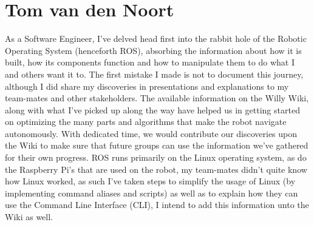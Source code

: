 \section{Tom van den Noort}

As a Software Engineer, I've delved head first into the rabbit hole of the Robotic Operating System (henceforth ROS), absorbing the information about how it is built, how its components function and how to manipulate them to do what I and others want it to. 
The first mistake I made is not to document this journey, although I did share my discoveries in presentations and explanations to my team-mates and other stakeholders. 
The available information on the Willy Wiki, along with what I've picked up along the way have helped us in getting started on optimizing the many parts and algorithms that make the robot navigate autonomously. With dedicated time, we would contribute our discoveries upon the Wiki to make sure that future groups can use the information we've gathered for their own progress. 
ROS runs primarily on the Linux operating system, as do the Raspberry Pi's that are used on the robot, my team-mates didn't quite know how Linux worked, as such I've taken steps to simplify the usage of Linux (by implementing command aliases and scripts) as well as to explain how they can use the Command Line Interface (CLI), I intend to add this information unto the Wiki as well. 